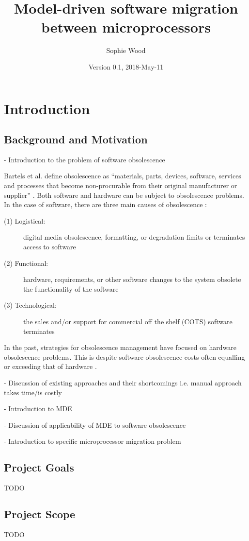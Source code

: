 \documentclass{UoYCSproject}
\author{Sophie Wood}
\title{Model-driven software migration between microprocessors}
\date{Version 0.1, 2018-May-11}
\begin{document}
\maketitle

\chapter{Introduction}
\section{Background and Motivation}
- Introduction to the problem of software obsolescence


Bartels et al. define obsolescence as ``materials, parts, devices, software, services and processes that become non-procurable from their original manufacturer or supplier'' \parencite{bartels2012strategies}. Both software and hardware can be subject to obsolescence problems. In the case of software, there are three main causes of obsolescence \parencite{sandborn2007obsolescence}:
\begin{description}
\item[(1) Logistical:] digital media obsolescence, formatting, or degradation limits or terminates access to software
\item[(2) Functional:] hardware, requirements, or other software changes to the system obsolete the functionality of the software
\item[(3) Technological:]  the sales and/or support for commercial off the shelf (COTS) software terminates
\end{description}

 
In the past, strategies for obsolescence management have focused on hardware obsolescence problems. This is despite software obsolescence costs often equalling or exceeding that of hardware \parencite{sandborn2007obsolescence}. 


- Discussion of existing approaches and their shortcomings i.e. manual approach takes time/is costly


- Introduction to MDE


- Discussion of applicability of MDE to software obsolescence


- Introduction to specific microprocessor migration problem
\section{Project Goals}
TODO
\section{Project Scope}
TODO
\end{document}
